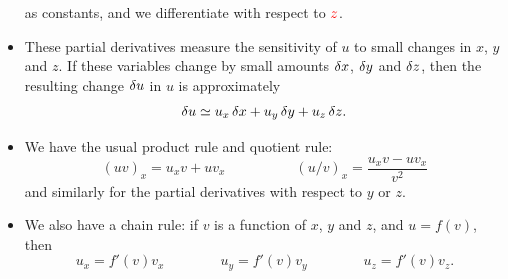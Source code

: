 \documentclass[9pt]{beamer}
\begin{document}
\begin{frame}[t]
\begin{itemize}
{   as constants, and we differentiate with respect to
   ${\color{red}z}$.}%
\fi%
  \item<6-> These partial derivatives measure the sensitivity of $u$
   to small changes in $x$, $y$ and $z$.  If these variables change by
   small amounts $\delta x$, $\delta y$ and $\delta z$, then the resulting
   change $\delta u$ in $u$ is approximately 
   \[ \delta u \simeq u_x\,\delta x + u_y\,\delta y + u_z\,\delta z. \]
  \item<7-> We have the usual product rule and quotient rule:
   \[ (uv)_x = u_x v + u v_x \hspace{5em} 
      (u/v)_x = \frac{u_xv-uv_x}{v^2}
   \]
   and similarly for the partial derivatives with respect to $y$ or $z$.
  \item<8-> We also have a chain rule: if $v$ is a function of $x$,
   $y$ and $z$, and $u=f(v)$, then 
   \[ u_x = f'(v)v_x \hspace{4em}
      u_y = f'(v)v_y \hspace{4em}
      u_z = f'(v)v_z.
   \] 
 \end{itemize}
\end{frame}
\end{document}
